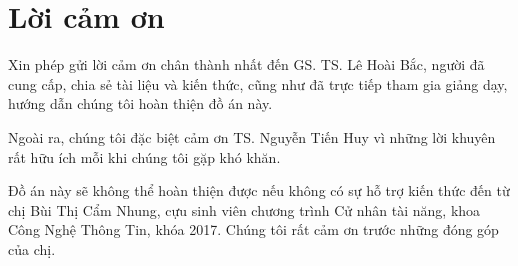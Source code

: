 \chapter*{Lời cảm ơn}
\label{thanks}

Xin phép gửi lời cảm ơn chân thành nhất đến GS. TS. Lê Hoài Bắc, người đã cung cấp, chia sẻ tài liệu và kiến thức, cũng như đã trực tiếp tham gia giảng dạy, hướng dẫn chúng tôi hoàn thiện đồ án này.

Ngoài ra, chúng tôi đặc biệt cảm ơn TS. Nguyễn Tiến Huy vì những lời khuyên rất hữu ích mỗi khi chúng tôi gặp khó khăn.

Đồ án này sẽ không thể hoàn thiện được nếu không có sự hỗ trợ kiến thức đến từ chị Bùi Thị Cẩm Nhung, cựu sinh viên chương trình Cử nhân tài năng, khoa Công Nghệ Thông Tin, khóa 2017. Chúng tôi rất cảm ơn trước những đóng góp của chị.